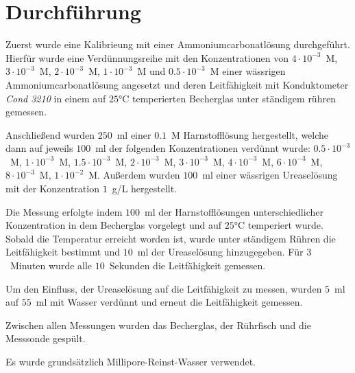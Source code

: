 \documentclass[12pt, letterpaper]{article}
\begin{document}
\section{Durchführung}

Zuerst wurde eine Kalibrieung mit einer Ammoniumcarbonatlösung durchgeführt. Hierfür wurde eine Verdünnungsreihe mit den Konzentrationen von $4 \cdot 10^{-3}$~M, $3 \cdot 10^{-3}$~M, $2 \cdot 10^{-3}$~M, $1 \cdot 10^{-3}$~M und $0.5 \cdot 10^{-3}$~M einer wässrigen Ammoniumcarbonatlösung angesetzt und deren Leitfähigkeit mit Konduktometer \textit{Cond 3210} in einem auf $25$°C temperierten Becherglas unter ständigem rühren gemessen.

Anschließend wurden $250$~ml einer $0.1$~M Harnstofflösung hergestellt, welche dann auf jeweils $100$~ml der folgenden Konzentrationen verdünnt wurde:
$0.5 \cdot 10^{-3}$~M, $1 \cdot 10^{-3}$~M, $1.5 \cdot 10^{-3}$~M, $2 \cdot 10^{-3}$~M, $3 \cdot 10^{-3}$~M, $4 \cdot 10^{-3}$~M, $6 \cdot 10^{-3}$~M, $8 \cdot 10^{-3}$~M,  $1 \cdot 10^{-2}$~M. Außerdem wurden $100$~ml einer wässrigen Ureaselösung mit der Konzentration $1$~g/L hergestellt.

Die Messung erfolgte indem $100$~ml der Harnstofflösungen unterschiedlicher Konzentration in dem Becherglas vorgelegt und auf $25$°C temperiert wurde. Sobald die Temperatur erreicht worden ist, wurde unter ständigem Rühren die Leitfähigkeit bestimmt und $10$~ml der Ureaselösung hinzugegeben. Für $3$~Minuten wurde alle $10$~Sekunden die Leitfähigkeit gemessen. 

Um den Einfluss, der Ureaselösung auf die Leitfähigkeit zu messen, wurden $5$~ml auf $55$~ml mit Wasser verdünnt und erneut die Leitfähigkeit gemessen. 

Zwischen allen Messungen wurden das Becherglas, der Rührfisch und die Messsonde gespült.



Es wurde grundsätzlich Millipore-Reinst-Wasser verwendet.
\end{document}
